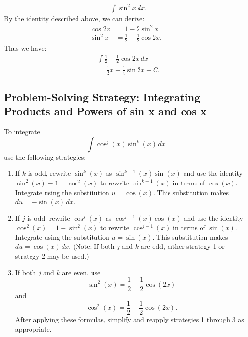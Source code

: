 \documentclass{report}
\begin{document}
        \bigbreak \noindent 
        \begin{eg}[Evaluate]
           \begin{align*}
               &\int \sin^{2}{x}\ dx
           .\end{align*} 
           \bigbreak \noindent 
           By the identity described above, we can derive:
           \begin{align*}
               \cos{2x} &= 1-2\sin^{2}{x} \\
               \sin^{2}{x} &= \frac{1}{2}-\frac{1}{2}\cos{2x} 
           .\end{align*}
           \bigbreak \noindent 
           Thus we have:
           \begin{align*}
               &\int \frac{1}{2}-\frac{1}{2}\cos{2x}\ dx \\
               &=\frac{1}{2}x - \frac{1}{4}\sin{2x} + C
           .\end{align*}
        \end{eg}

        \pagebreak 
        \subsection*{Problem-Solving Strategy: Integrating Products and Powers of sin x and cos x}
        \bigbreak \noindent 
        To integrate 
\[
\int \cos^j(x) \sin^k(x) \, dx
\]
use the following strategies:

\begin{enumerate}
    \item If \( k \) is odd, rewrite \( \sin^k(x) \) as \( \sin^{k-1}(x) \sin(x) \) and use the identity \( \sin^2(x) = 1 - \cos^2(x) \) to rewrite \( \sin^{k-1}(x) \) in terms of \( \cos(x) \). Integrate using the substitution \( u = \cos(x) \). This substitution makes \( du = -\sin(x) \, dx \).
    
    \item If \( j \) is odd, rewrite \( \cos^j(x) \) as \( \cos^{j-1}(x) \cos(x) \) and use the identity \( \cos^2(x) = 1 - \sin^2(x) \) to rewrite \( \cos^{j-1}(x) \) in terms of \( \sin(x) \). Integrate using the substitution \( u = \sin(x) \). This substitution makes \( du = \cos(x) \, dx \). (Note: If both \( j \) and \( k \) are odd, either strategy 1 or strategy 2 may be used.)
    
    \item If both \( j \) and \( k \) are even, use 
    \[
    \sin^2(x) = \frac{1}{2} - \frac{1}{2} \cos(2x)
    \]
    and 
    \[
    \cos^2(x) = \frac{1}{2} + \frac{1}{2} \cos(2x).
    \]
    After applying these formulas, simplify and reapply strategies 1 through 3 as appropriate.
\end{enumerate}


        

        


        
        

    
    
    
\end{document}
